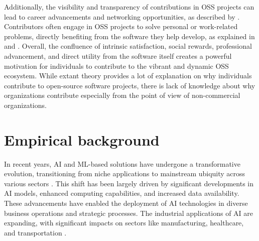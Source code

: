 \documentclass[CHICAGO,Times1COL]{WileyNJDv5} %
\begin{document}
Additionally, the visibility and transparency of contributions in OSS projects can lead to career advancements and networking opportunities, as described by \citet{Roberts_et_al2006}. Contributors often engage in OSS projects to solve personal or work-related problems, directly benefiting from the software they help develop, as explained in \citet{VonKrogh_and_VonHippel2006} and \citet{CrowstonWei_et_al2012}. Overall, the confluence of intrinsic satisfaction, social rewards, professional advancement, and direct utility from the software itself creates a powerful motivation for individuals to contribute to the vibrant and dynamic OSS ecosystem. While extant theory provides a lot of explanation on why individuals contribute to open-source software projects, there is lack of knowledge about why organizations contribute especially from the point of view of non-commercial organizations. 




\section{Empirical background}
\label{sec:empiricalbc}



 
  



 
In recent years, \ac{AI}  and \ac{ML}-based solutions have undergone a transformative evolution, transitioning from niche applications to mainstream ubiquity across various sectors \citep{davenport2023all}. This shift has been largely driven by significant developments in \ac{AI} models, enhanced computing capabilities, and increased data availability. These advancements have enabled the deployment of \ac{AI} technologies in diverse business operations and strategic processes. The industrial applications of \ac{AI} are expanding, with significant impacts on sectors like manufacturing, healthcare, and transportation \citep{benbya2020artificial}.
\end{document}
